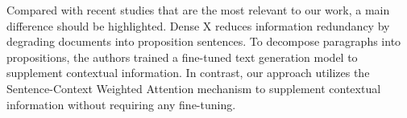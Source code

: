 Compared with recent studies \cite{hwangDSLRDocumentRefinement2024, chenDenseRetrievalWhat2024a} that are the most relevant to our work, a main difference should be highlighted. Dense X reduces information redundancy by degrading documents into proposition sentences. To decompose paragraphs into propositions, the authors trained a fine-tuned text generation model to supplement contextual information. In contrast, our approach utilizes the Sentence-Context Weighted Attention mechanism to supplement contextual information without requiring any fine-tuning.
